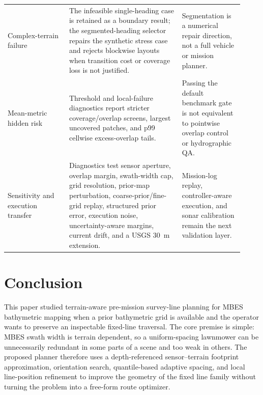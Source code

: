 \documentclass[jmse,article,submit,moreauthors]{Definitions/mdpi}
\begin{document}
\begin{table}[!htbp]
\begin{tabular}{@{}>{\raggedright\arraybackslash}p{0.24\linewidth}>{\raggedright\arraybackslash}p{0.44\linewidth}>{\raggedright\arraybackslash}p{0.24\linewidth}@{}}
		Complex-terrain failure & The infeasible single-heading case is retained as a boundary result; the segmented-heading selector repairs the synthetic stress case and rejects blockwise layouts when transition cost or coverage loss is not justified. & Segmentation is a numerical repair direction, not a full vehicle or mission planner. \\
		Mean-metric hidden risk & Threshold and local-failure diagnostics report stricter coverage/overlap screens, largest uncovered patches, and p99 cellwise excess-overlap tails. & Passing the default benchmark gate is not equivalent to pointwise overlap control or hydrographic QA. \\
		Sensitivity and execution transfer & Diagnostics test sensor aperture, overlap margin, swath-width cap, grid resolution, prior-map perturbation, coarse-prior/fine-grid replay, structured prior error, execution noise, uncertainty-aware margins, current drift, and a USGS 30~m extension. & Mission-log replay, controller-aware execution, and sonar calibration remain the next validation layer. \\
		\bottomrule[1bp]
	\end{tabular}
\end{table}

\section{Conclusion}
\label{sec:conclusion}
This paper studied terrain-aware pre-mission survey-line planning for MBES bathymetric mapping when a prior bathymetric grid is available and the operator wants to preserve an inspectable fixed-line traversal. The core premise is simple: MBES swath width is terrain dependent, so a uniform-spacing lawnmower can be unnecessarily redundant in some parts of a scene and too weak in others. The proposed planner therefore uses a depth-referenced sensor--terrain footprint approximation, orientation search, quantile-based adaptive spacing, and local line-position refinement to improve the geometry of the fixed line family without turning the problem into a free-form route optimizer.
\end{document}
